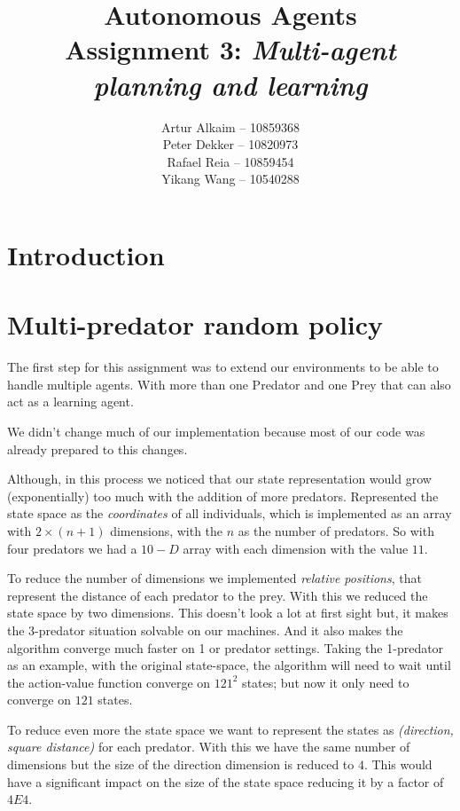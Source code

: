 \documentclass{article}
\begin{document}
\title{Autonomous Agents\\
Assignment 3: \emph{Multi-agent planning and learning}}
\author{
Artur Alkaim -- 10859368\\
Peter Dekker -- 10820973\\
Rafael Reia -- 10859454\\
Yikang Wang -- 10540288\\
}
\maketitle
\section{Introduction}

\section{Multi-predator random policy}
The first step for this assignment was to extend our environments to be able to
handle multiple agents. With more than one Predator and one Prey that can also
act as a learning agent.

We didn't change much of our implementation because most of our code was
already prepared to this changes.

Although, in this process we noticed that our state representation would grow
(exponentially) too much with the addition of more predators. Represented the
state space as the \emph{coordinates} of all individuals, which is implemented as
an array with $2 \times (n+1)$ dimensions, with the $n$ as the number of predators. So with four predators we had a $10-D$ array with each 
dimension with the value $11$. 

To reduce the number of dimensions we implemented \emph{relative positions},
that represent the distance of each predator to the prey. With this we reduced the
state space by two dimensions. This doesn't look a lot at first sight but, it makes the 3-predator situation solvable on our machines. And it also makes the algorithm converge much faster on 1 or predator settings. Taking the 1-predator as an example, with the original state-space, the algorithm will need to wait until the action-value function converge on $121^2$ states; but now it only need to converge on $121$ states.

To reduce even more the state space we want to represent the states as
\emph{(direction, square distance)} for each predator. With this we have the
same number of dimensions but the size of the direction dimension is reduced to $4$.
This would have a significant impact on the size of the state space reducing it
by a factor of $4E4$.
\end{document}
